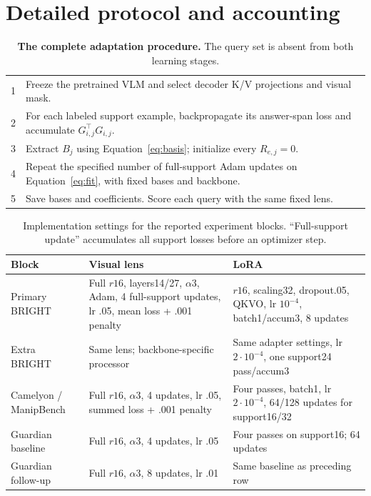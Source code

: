 \documentclass{article}
\begin{document}
\section{Detailed protocol and accounting}
\label{app:protocol}
\begin{table}[!ht]
\caption{\textbf{The complete adaptation procedure.} The query set is absent from both learning stages.}
\label{tab:algorithm}
\centering
\begin{tabularx}{\linewidth}{@{}r X@{}}
\toprule
1 & Freeze the pretrained VLM and select decoder K/V projections and visual mask.\\
2 & For each labeled support example, backpropagate its answer-span loss and accumulate $G_{i,j}^{\top}G_{i,j}$.\\
3 & Extract $B_j$ using Equation~\ref{eq:basis}; initialize every $R_{e,j}=0$.\\
4 & Repeat the specified number of full-support Adam updates on Equation~\ref{eq:fit}, with fixed bases and backbone.\\
5 & Save bases and coefficients. Score each query with the same fixed lens.\\
\bottomrule
\end{tabularx}
\end{table}
\begin{table}[!ht]
\caption{Implementation settings for the reported experiment blocks. ``Full-support update'' accumulates all support losses before an optimizer step.}
\centering\small
\begin{tabularx}{\linewidth}{@{}l X X@{}}
\toprule
Block & Visual lens & LoRA\\
\midrule
Primary BRIGHT & Full $r16$, layers14/27, $\alpha3$, Adam, 4 full-support updates, lr .05, mean loss + .001 penalty & $r16$, scaling32, dropout.05, QKVO, lr $10^{-4}$, batch1/accum3, 8 updates\\
Extra BRIGHT & Same lens; backbone-specific processor & Same adapter settings, lr $2\cdot10^{-4}$, one support24 pass/accum3\\
Camelyon / ManipBench & Full $r16$, $\alpha3$, 4 updates, lr .05, summed loss + .001 penalty & Four passes, batch1, lr $2\cdot10^{-4}$, 64/128 updates for support16/32\\
Guardian baseline & Full $r16$, $\alpha3$, 4 updates, lr .05 & Four passes on support16; 64 updates\\
Guardian follow-up & Full $r16$, $\alpha3$, 8 updates, lr .01 & Same baseline as preceding row\\
\bottomrule
\end{tabularx}
\end{table}
\end{document}

